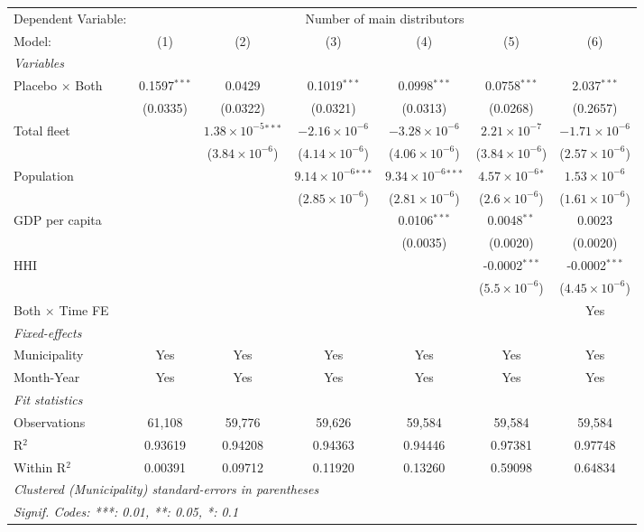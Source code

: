 \documentclass[
]{article}
\begin{document}
\begin{tabular}{lcccccc}
\tabularnewline\midrule\midrule
Dependent Variable:&\multicolumn{6}{c}{Number of main distributors}\\
Model:&(1) & (2) & (3) & (4) & (5) & (6)\\
\midrule \emph{Variables}&   &   &   &   &   &  \\
Placebo $\times $ Both & 0.1597$^{***}$ & 0.0429 & 0.1019$^{***}$ & 0.0998$^{***}$ & 0.0758$^{***}$ & 2.037$^{***}$\\
  &(0.0335) & (0.0322) & (0.0321) & (0.0313) & (0.0268) & (0.2657)\\
Total fleet &    & $1.38\times 10^{-5}$$^{***}$ & $-2.16\times 10^{-6}$ & $-3.28\times 10^{-6}$ & $2.21\times 10^{-7}$ & $-1.71\times 10^{-6}$\\
  &   & ($3.84\times 10^{-6}$) & ($4.14\times 10^{-6}$) & ($4.06\times 10^{-6}$) & ($3.84\times 10^{-6}$) & ($2.57\times 10^{-6}$)\\
Population &    &    & $9.14\times 10^{-6}$$^{***}$ & $9.34\times 10^{-6}$$^{***}$ & $4.57\times 10^{-6}$$^{*}$ & $1.53\times 10^{-6}$\\
  &   &    & ($2.85\times 10^{-6}$) & ($2.81\times 10^{-6}$) & ($2.6\times 10^{-6}$) & ($1.61\times 10^{-6}$)\\
GDP per capita &    &    &    & 0.0106$^{***}$ & 0.0048$^{**}$ & 0.0023\\
  &   &    &    & (0.0035) & (0.0020) & (0.0020)\\
HHI &    &    &    &    & -0.0002$^{***}$ & -0.0002$^{***}$\\
  &   &    &    &    & ($5.5\times 10^{-6}$) & ($4.45\times 10^{-6}$)\\
Both $\times$ Time FE &  &  &  &  &  & Yes\\
\midrule \emph{Fixed-effects}&   &   &   &   &   &  \\
Municipality & Yes & Yes & Yes & Yes & Yes & Yes\\
Month-Year & Yes & Yes & Yes & Yes & Yes & Yes\\
\midrule \emph{Fit statistics}&  & & & & & \\
Observations & 61,108&59,776&59,626&59,584&59,584&59,584\\
R$^2$ & 0.93619&0.94208&0.94363&0.94446&0.97381&0.97748\\
Within R$^2$ & 0.00391&0.09712&0.11920&0.13260&0.59098&0.64834\\
\midrule\midrule\multicolumn{7}{l}{\emph{Clustered (Municipality) standard-errors in parentheses}}\\
\multicolumn{7}{l}{\emph{Signif. Codes: ***: 0.01, **: 0.05, *: 0.1}}\\
\end{tabular}
\end{document}
